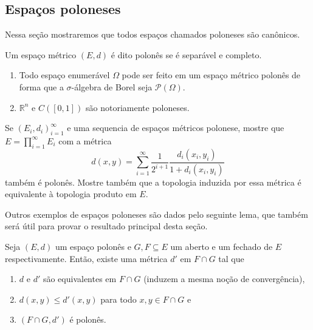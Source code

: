 \begin{topics}
\subsection{Espaços poloneses}

Nessa seção mostraremos que todos espaços chamados poloneses são canônicos.

\begin{definition}
  Um espaço métrico $(E,d)$ é dito polonês  se é separável e completo.
\end{definition}

\begin{example} \mbox{}
  \begin{enumerate}[\quad a)]
  \item Todo espaço enumerável $\Omega$ pode ser feito em um espaço métrico polonês de forma que a $\sigma$-álgebra de Borel seja $\mathcal{P}(\Omega)$.
  \item $\mathbb{R}^n$ e $C([0,1])$ são notoriamente poloneses.
  \end{enumerate}
\end{example}

\begin{exercise}
  Se $(E_i, d_i)_{i=1}^\infty$ e uma sequencia de espaços métricos polonese, mostre que $E = \prod_{i=1}^{\infty} E_i$ com a métrica
  \begin{equation}
    \label{e:metrica_produto}
    d(x,y) = \sum_{i=1}^{\infty} \frac{1}{2^{i+1}} \frac{d_i(x_i, y_i)}{1 + d_i(x_i, y_i)}
  \end{equation}
  também é polonês.
  Mostre também que a topologia induzida por essa métrica é equivalente à topologia produto em $E$.
\end{exercise}

Outros exemplos de espaços poloneses são dados pelo seguinte lema, que também será útil para provar o resultado principal desta seção.

\begin{lemma}
  \label{l:sub_polones}
  Seja $(E,d)$ um espaço polonês e $G, F \subseteq E$ um aberto e um fechado de $E$ respectivamente.
  Então, existe uma métrica $d'$ em $F \cap G$ tal que
  \begin{enumerate}[\quad a)]
  \item $d$ e $d'$ são equivalentes em $F \cap G$ (induzem a mesma noção de convergência),
  \item $d(x,y) \leq d'(x,y)$ para todo $x, y \in F \cap G$ e
  \item $(F \cap G, d')$ é polonês.
  \end{enumerate}
\end{lemma}


\end{topics}
